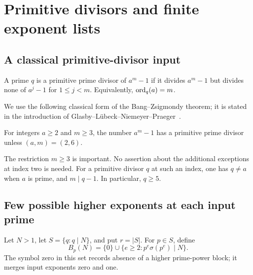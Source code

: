 \chapter{Primitive divisors and finite exponent lists}\label{ch:primitive}
\section{A classical primitive-divisor input}
A prime $q$ is a primitive prime divisor of $a^m-1$ if it divides $a^m-1$ but divides none of $a^j-1$ for $1\le j<m$. Equivalently, $\operatorname{ord}_q(a)=m$.

We use the following classical form of the Bang--Zsigmondy theorem; it is stated in the introduction of Glasby--L\"ubeck--Niemeyer--Praeger~\cite{zsig}.

\begin{theorem}\label{primitive:thm:bang}
For integers $a\ge2$ and $m\ge3$, the number $a^m-1$ has a primitive prime divisor unless $(a,m)=(2,6)$.
\end{theorem}

The restriction $m\ge3$ is important. No assertion about the additional exceptions at index two is needed. For a primitive divisor $q$ at such an index, one has $q\ne a$ when $a$ is prime, and $m\mid q-1$. In particular, $q\ge5$.


\section{Few possible higher exponents at each input prime}
Let $N>1$, let $S=\{q:q\mid N\}$, and put $r=|S|$. For $p\in S$, define
\[
 B_p(N)=\{0\}\cup\{e\ge2:p^e\sigma(p^e)\mid N\}.
\]
The symbol zero in this set records absence of a higher prime-power block; it merges input exponents zero and one.

